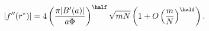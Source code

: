 \begin{equation}
\label{Eq_A09}
|f''(r^{*})|
  = 4 \left(\frac{\pi|B'(a)|}{a\Phi}\right)^{\half} \sqrt{mN}
    \left(1 + O\left(\frac{m}{N}\right)^{\half}\right).
\end{equation}

